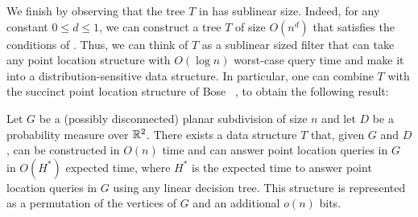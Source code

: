 \documentclass{patmorin}
\begin{document}
We finish by observing that the tree $T$ in 
has sublinear size. Indeed, for any constant $0 \le d \le 1$, we can
construct a tree $T$ of size $O(n^d)$ that satisfies the conditions
of .  Thus, we can think of $T$ as a sublinear
sized filter that can take any point location structure with $O(\log n)$
worst-case query time and make it into a distribution-sensitive data
structure.  In particular, one can combine $T$ with the succinct point
location structure of Bose \etal\ \cite[Theorem~2]{bchmm09}, to obtain the
following result:

\begin{thm}
  Let $G$ be a (possibly disconnected) planar subdivision of size $n$
  and let $D$ be a probability measure over $\mathbb{R}^2$.  There exists a data
  structure $T$ that, given $G$ and $D$, can be constructed in $O(n)$
  time and can answer point location queries in $G$ in $O(H^*)$ expected
  time, where $H^*$ is the expected time to answer point location queries
  in $G$ using any linear decision tree.  This structure is represented
  as a permutation of the vertices of $G$ and an additional $o(n)$ bits.
\end{thm}






\end{document}
